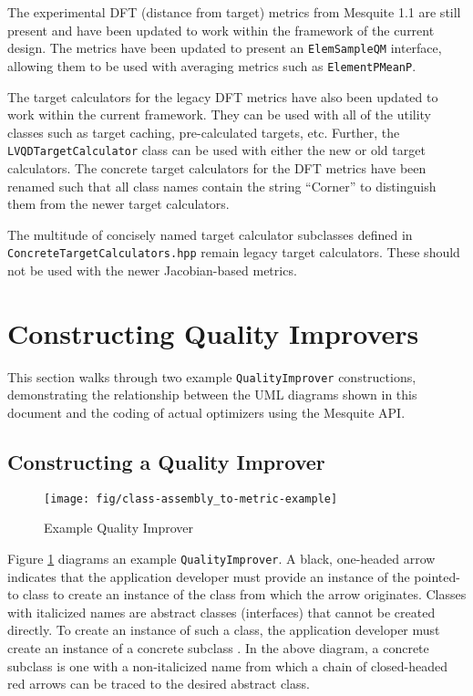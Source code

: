 \documentclass{article}
\begin{document}
The experimental DFT (distance from target) metrics from Mesquite 1.1 are still present and have been updated to work within the framework of the current design.  The metrics have been updated to present an \texttt{ElemSampleQM} interface, allowing them to be used with averaging metrics such as \texttt{ElementPMeanP}.  

The target calculators for the legacy DFT metrics have also been updated to work within the current framework.  They can be used with all of the utility classes such as target caching, pre-calculated targets, etc.  Further, the \texttt{LVQDTargetCalculator} class can be used with either the new or old target calculators.  The concrete target calculators for the DFT metrics have been renamed such that all class names contain the string ``Corner'' to distinguish them from the newer target calculators.  

The multitude of concisely named target calculator subclasses defined in \texttt{ConcreteTargetCalculators.hpp} remain legacy target calculators.  These should not be used with the newer Jacobian-based metrics.

\section{Constructing Quality Improvers}

This section walks through two example \texttt{QualityImprover} constructions, demonstrating the relationship between the UML diagrams shown in this document and the coding of actual optimizers using the Mesquite API.

\subsection{Constructing a Quality Improver}
\label{sec:ex1}

\begin{figure}[htb]
\begin{center}
\texttt{[image: fig/class-assembly\_to-metric-example]}
\caption{Example Quality Improver\label{fig:qiexample}}
\end{center}
\end{figure}

Figure \ref{fig:qiexample} diagrams an example \texttt{QualityImprover}.  A black, one-headed arrow indicates that the application developer must provide an instance of the pointed-to class to create an instance of the class from which the arrow originates.  Classes with italicized names are abstract classes (interfaces) that cannot be created directly.  To create an instance of such a class, the application developer must create an instance of a concrete subclass .  In the above diagram, a concrete subclass is one with a non-italicized name from which a chain of closed-headed red arrows can be traced to the desired abstract class.
\end{document}
